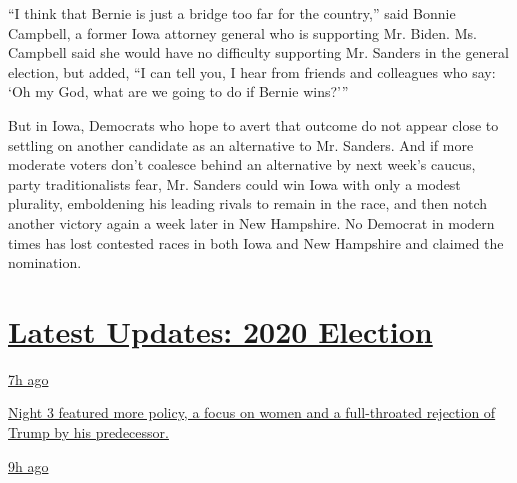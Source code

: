 ``I think that Bernie is just a bridge too far for the country,'' said
Bonnie Campbell, a former Iowa attorney general who is supporting Mr.
Biden. Ms. Campbell said she would have no difficulty supporting Mr.
Sanders in the general election, but added, ``I can tell you, I hear
from friends and colleagues who say: `Oh my God, what are we going to do
if Bernie wins?'''

But in Iowa, Democrats who hope to avert that outcome do not appear
close to settling on another candidate as an alternative to Mr. Sanders.
And if more moderate voters don't coalesce behind an alternative by next
week's caucus, party traditionalists fear, Mr. Sanders could win Iowa
with only a modest plurality, emboldening his leading rivals to remain
in the race, and then notch another victory again a week later in New
Hampshire. No Democrat in modern times has lost contested races in both
Iowa and New Hampshire and claimed the nomination.

\hypertarget{latest-updates-2020-election}{%
\section{\texorpdfstring{\href{https://www.nytimes3xbfgragh.onion/live/2020/08/19/us/dnc-convention-election?action=click\&pgtype=Article\&state=default\&region=MAIN_CONTENT_1\&context=storylines_live_updates}{Latest
Updates: 2020
Election}}{Latest Updates: 2020 Election}}\label{latest-updates-2020-election}}

\href{https://www.nytimes3xbfgragh.onion/live/2020/08/19/us/dnc-convention-election?action=click\&pgtype=Article\&state=default\&region=MAIN_CONTENT_1\&context=storylines_live_updates\#night-3-featured-more-policy-a-focus-on-women-and-a-full-throated-rejection-of-trump-by-his-predecessor}{7h
ago}

\href{https://www.nytimes3xbfgragh.onion/live/2020/08/19/us/dnc-convention-election?action=click\&pgtype=Article\&state=default\&region=MAIN_CONTENT_1\&context=storylines_live_updates\#night-3-featured-more-policy-a-focus-on-women-and-a-full-throated-rejection-of-trump-by-his-predecessor}{Night
3 featured more policy, a focus on women and a full-throated rejection
of Trump by his predecessor.}

\href{https://www.nytimes3xbfgragh.onion/live/2020/08/19/us/dnc-convention-election?action=click\&pgtype=Article\&state=default\&region=MAIN_CONTENT_1\&context=storylines_live_updates\#trump-live-tweeted-obamas-speech-tonight-hell-appear-on-fox-news-right-before-bidens-tomorrow}{9h
ago}

